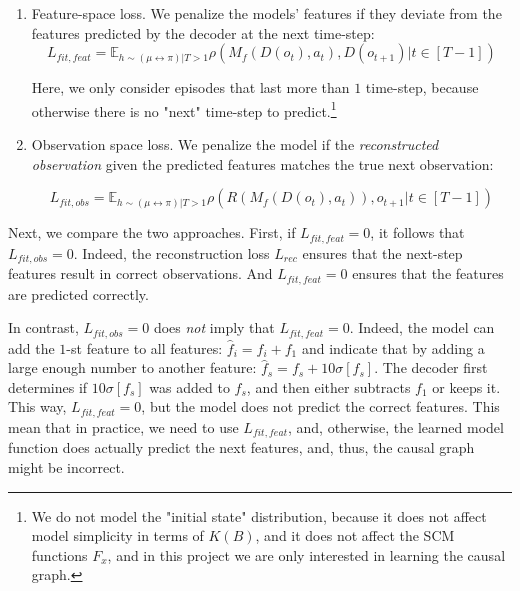 \documentclass[a4paper,11pt,oneside]{report}
\begin{document}
\begin{enumerate}
    \item Feature-space loss. We penalize the models' features if they deviate from the features predicted by the decoder at the next time-step:
    \begin{equation}
    \label{eq:loss_fit_feature}
    L_{fit,feat}=\mathbb E_{h\sim (\mu\leftrightarrow\pi)|T>1}\rho(M_f(D(o_t), a_t), D(o_{t+1})|t\in [T-1])
    \end{equation}

    Here, we only consider episodes that last more than $1$ time-step, because otherwise there is no "next" time-step to predict.\footnote{We do not model the "initial state" distribution, because it does not affect model simplicity in terms of $K(B)$, and it does not affect the SCM functions $F_x$, and in this project we are only interested in learning the causal graph.}

    \item Observation space loss. We penalize the model if the {\em reconstructed observation} given the predicted features matches the true next observation:

    \begin{equation}
    \label{eq:loss_fit_obs_space}
    L_{fit,obs}=\mathbb E_{h\sim (\mu\leftrightarrow \pi)|T>1}\rho(R(M_f(D(o_t), a_t)), o_{t+1}|t\in [T-1])
    \end{equation}
\end{enumerate}

Next, we compare the two approaches. First, if $L_{fit, feat}=0$, it follows that $L_{fit, obs}=0$. Indeed, the reconstruction loss $L_{rec}$ ensures that the next-step features result in correct observations. And $L_{fit, feat}=0$ ensures that the features are predicted correctly.

In contrast, $L_{fit,obs}=0$ does {\em not} imply that $L_{fit, feat}=0$. Indeed, the model can add the $1$-st feature to all features: $\hat{f}_i=f_i+f_1$ and indicate that by adding a large enough number to another feature: $\hat{f}_s=f_s+10\sigma[f_s]$. The decoder first determines if $10\sigma[f_s]$ was added to $f_s$, and then either subtracts $f_1$ or keeps it. This way, $L_{fit, feat}=0$, but the model does not predict the correct features. This mean that in practice, we need to use $L_{fit,feat}$, and, otherwise, the learned model function does actually predict the next features, and, thus, the causal graph might be incorrect.
\end{document}
